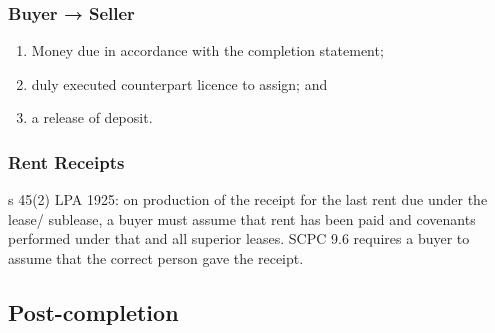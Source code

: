 \documentclass[
]{article}
\providecommand{\tightlist}{%
  \setlength{\itemsep}{0pt}\setlength{\parskip}{0pt}}
\begin{document}
\hypertarget{buyer-seller}{%
\subsubsection{Buyer → Seller}\label{buyer-seller}}

\begin{enumerate}
\def\labelenumi{\arabic{enumi}.}
\tightlist
\item
  Money due in accordance with the completion statement;
\item
  duly executed counterpart licence to assign; and
\item
  a release of deposit.
\end{enumerate}

\hypertarget{rent-receipts}{%
\subsubsection{Rent Receipts}\label{rent-receipts}}

s 45(2) LPA 1925: on production of the receipt for the last rent due
under the lease/ sublease, a buyer must assume that rent has been paid
and covenants performed under that and all superior leases. SCPC 9.6
requires a buyer to assume that the correct person gave the receipt.

\hypertarget{post-completion-1}{%
\subsection{Post-completion}\label{post-completion-1}}
\end{document}
